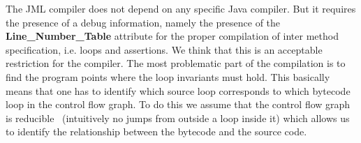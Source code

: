 The JML compiler does not depend on any specific Java compiler. But it requires the presence of a debug information, namely the presence of the \textbf{Line\_Number\_Table} attribute for the proper compilation of inter method specification, i.e. loops and assertions. We think that this is an acceptable restriction for the compiler. The most problematic part of the compilation is to find the program points where the loop invariants must hold. This basically means that one has to identify which source loop corresponds to which bytecode loop in the control flow graph. To do this we assume that the control flow graph is reducible~\cite{ARUCom1986} (intuitively no jumps from outside a loop inside it) which allows us to identify the relationship between the bytecode and the source code. 
